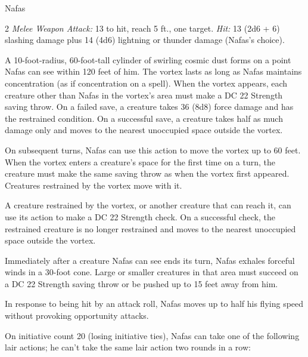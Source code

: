 \documentclass[10pt,a4paper,twoside,bg=print,twocolumn,openany,nodeprecatedcode]{dndbook}
\begin{document}
\begin{DndMonster}[float*=b,width=\textwidth + 8pt]{Nafas}
\begin{multicols}{2}
\textsl{Melee Weapon Attack:} 13 to hit, reach 5 ft., one target. \textsl{Hit:} 13 (2d6 + 6) slashing damage plus 14 (4d6) lightning or thunder damage (Nafas's choice).

A 10-foot-radius, 60-foot-tall cylinder of swirling cosmic dust forms on a point Nafas can see within 120 feet of him. The vortex lasts as long as Nafas maintains concentration (as if concentration on a spell). When the vortex appears, each creature other than Nafas in the vortex's area must make a DC 22 Strength saving throw. On a failed save, a creature takes 36 (8d8) force damage and has the restrained condition. On a successful save, a creature takes half as much damage only and moves to the nearest unoccupied space outside the vortex.

On subsequent turns, Nafas can use this action to move the vortex up to 60 feet. When the vortex enters a creature's space for the first time on a turn, the creature must make the same saving throw as when the vortex first appeared. Creatures restrained by the vortex move with it.

A creature restrained by the vortex, or another creature that can reach it, can use its action to make a DC 22 Strength check. On a successful check, the restrained creature is no longer restrained and moves to the nearest unoccupied space outside the vortex.

Immediately after a creature Nafas can see ends its turn, Nafas exhales forceful winds in a 30-foot cone. Large or smaller creatures in that area must succeed on a DC 22 Strength saving throw or be pushed up to 15 feet away from him.

In response to being hit by an attack roll, Nafas moves up to half his flying speed without provoking opportunity attacks.

On initiative count 20 (losing initiative ties), Nafas can take one of the following lair actions; he can't take the same lair action two rounds in a row:



\end{multicols}
\end{DndMonster}
\end{document}
